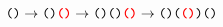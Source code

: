 \documentclass[12pt]{standalone}
\begin{document}
	$
	\texttt{()}
		\rightarrow
	\texttt{()\textbf{\textcolor{red}{()}}}
		\rightarrow
	\texttt{()()\textbf{\textcolor{red}{()}}}
		\rightarrow
	\texttt{()(\textbf{\textcolor{red}{()}})()}
	$
\end{document}

